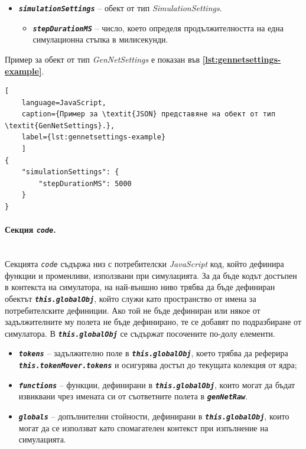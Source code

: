 \begin{itemize}
\item \texttt{\textbf{\textit{simulationSettings}}} -- обект от тип \textit{SimulationSettings}.
\begin{itemize}
\item \texttt{\textbf{\textit{stepDurationMS}}} -- число, което определя продължителността на една симулационна стъпка в милисекунди.
\end{itemize}
\end{itemize}

Пример за обект от тип \textit{GenNetSettings} е показан във \textbf{\autoref{lst:gennetsettings-example}}.
\begin{lstlisting}[
	language=JavaScript,
	caption={Пример за \textit{JSON} представяне на обект от тип \textit{GenNetSettings}.},
	label={lst:gennetsettings-example}
	]
{
    "simulationSettings": {
        "stepDurationMS": 5000
    }
}
\end{lstlisting}

\vspace{-10pt}
\paragraph{Секция \textit{\texttt{code}}.}\mbox{}\\
Секцията \textit{\texttt{code}} съдържа низ с потребителски \textit{JavaScript} код, който дефинира функции и променливи, използвани при симулацията. За да бъде кодът достъпен в контекста на симулатора, на най-външно ниво трябва да бъде дефиниран обектът \texttt{\textbf{\textit{this.globalObj}}}, който служи като пространство от имена за потребителските дефиниции. Ако той не бъде дефиниран или някое от задължителните му полета не бъде дефинирано, те се добавят по подразбиране от симулатора. В \texttt{\textbf{\textit{this.globalObj}}} се съдържат посочените по-долу елементи.

\begin{itemize}
\item \texttt{\textbf{\textit{tokens}}} -- задължително поле в \texttt{\textbf{\textit{this.globalObj}}}, което трябва да реферира \texttt{\textbf{\textit{this.tokenMover.tokens}}} и осигурява достъп до текущата колекция от ядра;
\item \texttt{\textbf{\textit{functions}}} -- функции, дефинирани в \texttt{\textbf{\textit{this.globalObj}}}, които могат да бъдат извиквани чрез имената си от съответните полета в \texttt{\textbf{\textit{genNetRaw}}}.
\item \texttt{\textbf{\textit{globals}}} -- допълнителни стойности, дефинирани в \texttt{\textbf{\textit{this.globalObj}}}, които могат да се използват като спомагателен контекст при изпълнение на симулацията.
\end{itemize}

